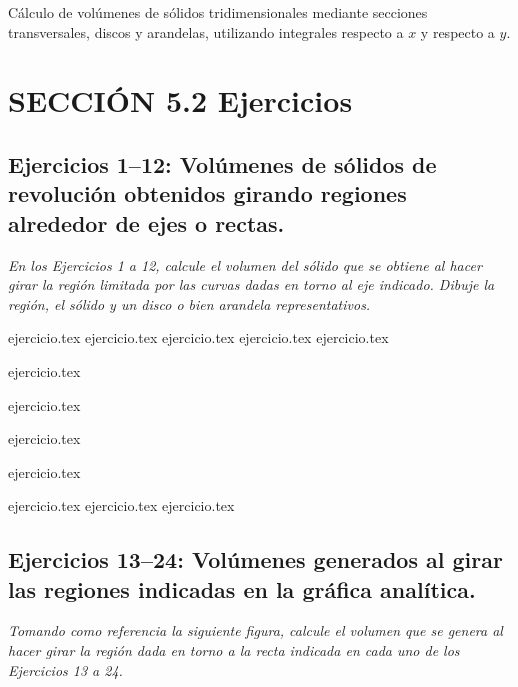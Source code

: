 
Cálculo de volúmenes de sólidos tridimensionales mediante secciones transversales, discos y arandelas, utilizando integrales respecto a $x$ y respecto a $y$.

\section*{SECCIÓN 5.2 \quad Ejercicios}

\subsection*{Ejercicios 1--12: Volúmenes de sólidos de revolución obtenidos girando regiones alrededor de ejes o rectas.}

\noindent \textit{En los Ejercicios 1 a 12, calcule el volumen del sólido que se obtiene al hacer girar la región limitada por las curvas dadas en torno al eje indicado. Dibuje la región, el sólido y un disco o bien arandela representativos.}

\begin{enumerate}
    \begin{minipage}{0.45\textwidth}
    {ejercicio.tex}
    {ejercicio.tex}
    {ejercicio.tex}
    {ejercicio.tex}
    {ejercicio.tex}
    \end{minipage}%
    \begin{minipage}{0.45\textwidth}
    \setcounter{enumi}{1}
    {ejercicio.tex}
    \addtocounter{enumi}{1}
    {ejercicio.tex}
    \addtocounter{enumi}{1}
    {ejercicio.tex}
    \addtocounter{enumi}{1}
    {ejercicio.tex}
    \addtocounter{enumi}{1}
    {ejercicio.tex}
    {ejercicio.tex}
    {ejercicio.tex}
    \end{minipage}
\end{enumerate}

\subsection*{Ejercicios 13--24: Volúmenes generados al girar las regiones indicadas en la gráfica analítica.}

\noindent \textit{Tomando como referencia la siguiente figura, calcule el volumen que se genera al hacer girar la región dada en torno a la recta indicada en cada uno de los Ejercicios 13 a 24.}

